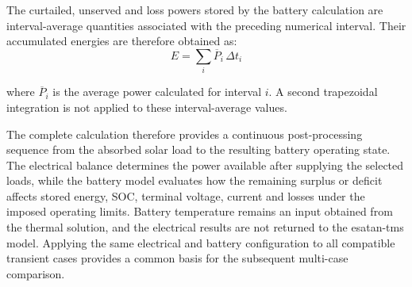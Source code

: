 
\NominalBatterySummaryTable[1.0\textwidth]

The curtailed, unserved and loss powers stored by the battery calculation are
interval-average quantities associated with the preceding numerical interval.
Their accumulated energies are therefore obtained as:
\begin{equation}
    E
    =
    \sum_i
    \overline{P}_i\,\Delta t_i
\end{equation}

where \(\overline{P}_i\) is the average power calculated for interval \(i\).
A second trapezoidal integration is not applied to these interval-average
values.

The complete calculation therefore provides a continuous post-processing
sequence from the absorbed solar load to the resulting battery operating
state. The electrical balance determines the power available after supplying
the selected loads, while the battery model evaluates how the remaining
surplus or deficit affects stored energy, SOC, terminal voltage, current and
losses under the imposed operating limits. Battery temperature remains an
input obtained from the thermal solution, and the electrical results are not
returned to the \acrshort{esatan-tms} model. Applying the same electrical and
battery configuration to all compatible transient cases provides a common
basis for the subsequent multi-case comparison.

\FloatBarrier
